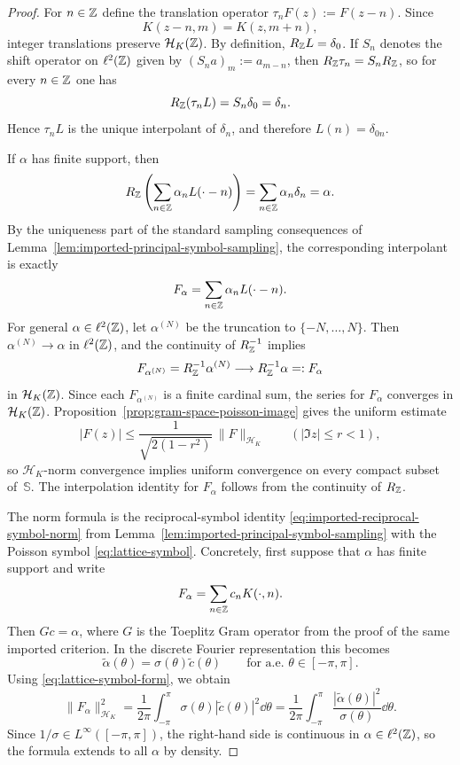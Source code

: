 \begin{proof}
For $n\in\mathbb{Z}$ define the translation operator
$\tau_nF(z):=F(z-n)$.  Since
\[
K(z-n,m)=K(z,m+n),
\]
integer translations preserve $\mathcal H_K(\mathbb{Z})$.  By definition,
$R_{\mathbb{Z}}L=\delta_0$.  If $S_n$ denotes the shift operator on
$\ell^2(\mathbb{Z})$ given by $(S_na)_m:=a_{m-n}$, then
$R_{\mathbb{Z}}\tau_n=S_nR_{\mathbb{Z}}$, so for every $n\in\mathbb{Z}$
one has
\[
R_{\mathbb{Z}}(\tau_nL)=S_n\delta_0=\delta_n.
\]
Hence $\tau_nL$ is the unique interpolant of $\delta_n$, and therefore
$L(n)=\delta_{0n}$.

If $\alpha$ has finite support, then
\[
R_{\mathbb{Z}}\left(\sum_{n\in\mathbb{Z}}\alpha_nL(\cdot-n)\right)
=\sum_{n\in\mathbb{Z}}\alpha_n\delta_n
=\alpha.
\]
By the uniqueness part of
the standard sampling consequences of
Lemma~\ref{lem:imported-principal-symbol-sampling}, the corresponding
interpolant
is exactly
\[
F_\alpha=\sum_{n\in\mathbb{Z}}\alpha_nL(\cdot-n).
\]
For general $\alpha\in\ell^2(\mathbb{Z})$, let $\alpha^{(N)}$ be the truncation
to $\{-N,\dots,N\}$.  Then $\alpha^{(N)}\to\alpha$ in $\ell^2(\mathbb{Z})$, and
the continuity of $R_{\mathbb{Z}}^{-1}$ implies
\[
F_{\alpha^{(N)}}=R_{\mathbb{Z}}^{-1}\alpha^{(N)}
\longrightarrow
R_{\mathbb{Z}}^{-1}\alpha=:F_\alpha
\]
in $\mathcal H_K(\mathbb{Z})$.  Since each $F_{\alpha^{(N)}}$ is a finite
cardinal sum, the series for $F_\alpha$ converges in $\mathcal H_K(\mathbb{Z})$.
Proposition~\ref{prop:gram-space-poisson-image} gives the uniform estimate
\[
|F(z)|\le \frac{1}{\sqrt{2(1-r^2)}}\,\|F\|_{\mathcal H_K}
\qquad(|\Im z|\le r<1),
\]
so $\mathcal H_K$-norm convergence implies uniform convergence on every
compact subset of~$\mathbb S$.  The interpolation identity for $F_\alpha$
follows from the continuity of $R_{\mathbb{Z}}$.

The norm formula is the reciprocal-symbol identity
\eqref{eq:imported-reciprocal-symbol-norm} from
Lemma~\ref{lem:imported-principal-symbol-sampling} with the Poisson symbol
\eqref{eq:lattice-symbol}.  Concretely, first suppose that $\alpha$
has finite support and write
\[
F_\alpha=\sum_{n\in\mathbb{Z}}c_nK(\cdot,n).
\]
Then $Gc=\alpha$, where $G$ is the Toeplitz Gram operator from the proof
of the same imported criterion.  In the discrete Fourier
representation this becomes
\[
\widetilde\alpha(\theta)=\sigma(\theta)\widetilde c(\theta)
\qquad\text{for a.e. }\theta\in[-\pi,\pi].
\]
Using \eqref{eq:lattice-symbol-form}, we obtain
\[
\|F_\alpha\|_{\mathcal H_K}^2
=\frac{1}{2\pi}\int_{-\pi}^{\pi}
\sigma(\theta)|\widetilde c(\theta)|^2\dd\theta
=\frac{1}{2\pi}\int_{-\pi}^{\pi}
\frac{|\widetilde\alpha(\theta)|^2}{\sigma(\theta)}\dd\theta.
\]
Since $1/\sigma\in L^\infty([-\pi,\pi])$, the right-hand side is
continuous in $\alpha\in\ell^2(\mathbb{Z})$, so the formula extends to all
$\alpha$ by density.


\end{proof}
